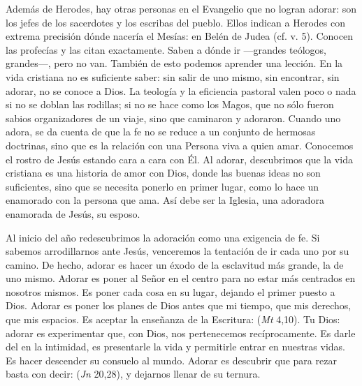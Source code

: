 {Además de Herodes, hay otras personas en el Evangelio que no logran adorar: son los jefes de los sacerdotes y los escribas del pueblo. Ellos indican a Herodes con extrema precisión dónde nacería el Mesías: en Belén de Judea (cf. v. 5). Conocen las profecías y las citan exactamente. Saben a dónde ir ---grandes teólogos, grandes---, pero no van. También de esto podemos aprender una lección. En la vida cristiana no es suficiente saber: sin salir de uno mismo, sin encontrar, sin adorar, no se conoce a Dios. La teología y la eficiencia pastoral valen poco o nada si no se doblan las rodillas; si no se hace como los Magos, que no sólo fueron sabios organizadores de un viaje, sino que caminaron y adoraron. Cuando uno adora, se da cuenta de que la fe no se reduce a un conjunto de hermosas doctrinas, sino que es la relación con una Persona viva a quien amar. Conocemos el rostro de Jesús estando cara a cara con Él. Al adorar, descubrimos que la vida cristiana es una historia de amor con Dios, donde las buenas ideas no son suficientes, sino que se necesita ponerlo en primer lugar, como lo hace un enamorado con la persona que ama. Así debe ser la Iglesia, una adoradora enamorada de Jesús, su esposo.

Al inicio del año redescubrimos la adoración como una exigencia de fe. Si sabemos arrodillarnos ante Jesús, venceremos la tentación de ir cada uno por su camino. De hecho, adorar es hacer un éxodo de la esclavitud más grande, la de uno mismo. Adorar es poner al Señor en el centro para no estar más centrados en nosotros mismos. Es poner cada cosa en su lugar, dejando el primer puesto a Dios. Adorar es poner los planes de Dios antes que mi tiempo, que mis derechos, que mis espacios. Es aceptar la enseñanza de la Escritura:  (\emph{Mt} 4,10). Tu Dios: adorar es experimentar que, con Dios, nos pertenecemos recíprocamente. Es darle del  en la intimidad, es presentarle la vida y permitirle entrar en nuestras vidas. Es hacer descender su consuelo al mundo. Adorar es descubrir que para rezar basta con decir:  (\emph{Jn} 20,28), y dejarnos llenar de su ternura.

}
